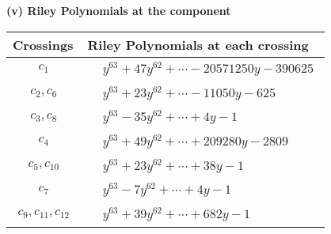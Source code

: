\documentclass[1p]{elsarticle_modified}
\theoremstyle{definition}
\begin{document}
\newpage\renewcommand{\arraystretch}{1}
\flushleft \textbf{(v) Riley Polynomials at the component}\newline \\
\begin{tabular}{m{50pt}|m{274pt}}
Crossings & \hspace{64pt}Riley Polynomials at each crossing \\
\hline $$\begin{aligned}c_{1}\end{aligned}$$&$\begin{aligned}
&y^{63}+47 y^{62}+\cdots-20571250 y-390625
\end{aligned}$\\
\hline $$\begin{aligned}c_{2},c_{6}\end{aligned}$$&$\begin{aligned}
&y^{63}+23 y^{62}+\cdots-11050 y-625
\end{aligned}$\\
\hline $$\begin{aligned}c_{3},c_{8}\end{aligned}$$&$\begin{aligned}
&y^{63}-35 y^{62}+\cdots+4 y-1
\end{aligned}$\\
\hline $$\begin{aligned}c_{4}\end{aligned}$$&$\begin{aligned}
&y^{63}+49 y^{62}+\cdots+209280 y-2809
\end{aligned}$\\
\hline $$\begin{aligned}c_{5},c_{10}\end{aligned}$$&$\begin{aligned}
&y^{63}+23 y^{62}+\cdots+38 y-1
\end{aligned}$\\
\hline $$\begin{aligned}c_{7}\end{aligned}$$&$\begin{aligned}
&y^{63}-7 y^{62}+\cdots+4 y-1
\end{aligned}$\\
\hline $$\begin{aligned}c_{9},c_{11},c_{12}\end{aligned}$$&$\begin{aligned}
&y^{63}+39 y^{62}+\cdots+682 y-1
\end{aligned}$\\
\hline
\end{tabular}\\~\\
\end{document}
